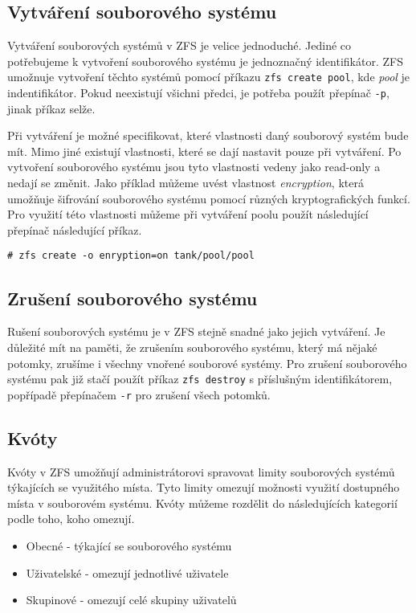 \subsection{Vytváření souborového systému}
\label{createfs}
Vytváření souborových systémů v ZFS je velice jednoduché. Jediné co potřebujeme k vytvoření souborového systému je jednoznačný identifikátor. ZFS umožnuje vytvoření těchto systémů pomocí příkazu \verb|zfs create pool|, kde \emph{pool} je indentifikátor. Pokud neexistují všichni předci, je potřeba použít přepínač \verb|-p|, jinak příkaz selže.

Při vytváření je možné specifikovat, které vlastnosti daný souborový systém bude mít. Mimo jiné existují vlastnosti, které se dají nastavit pouze při vytváření. Po vytvoření souborového systému jsou tyto vlastnosti vedeny jako read-only a nedají se změnit. Jako příklad můžeme uvést vlastnost \emph{encryption}, která umožňuje šifrování souborového systému pomocí různých kryptografických funkcí. Pro využití této vlastnosti můžeme při vytváření poolu použít následující přepínač následující příkaz.
\begin{verbatim}
# zfs create -o enryption=on tank/pool/pool
\end{verbatim}
\subsection{Zrušení souborového systému}
Rušení souborových systému je v ZFS stejně snadné jako jejich vytváření. Je důležité mít na paměti, že zrušením souborového systému, který má nějaké potomky, zrušíme i všechny vnořené souborové systémy. Pro zrušení souborového systému pak již stačí použít příkaz \verb|zfs destroy| s příslušným identifikátorem, popřípadě přepínačem \verb|-r| pro zrušení všech potomků.
\subsection{Kvóty}
\label{quota}

Kvóty v ZFS umožňují administrátorovi spravovat limity souborových systémů týkajících se využitého místa. Tyto limity omezují možnosti využití dostupného místa v souborovém systému. Kvóty můžeme rozdělit do následujících kategorií podle toho, koho omezují.
\begin{itemize}
  \item Obecné - týkající se souborového systému
  \item Uživatelské - omezují jednotlivé uživatele
  \item Skupinové - omezují celé skupiny uživatelů
\end{itemize}

